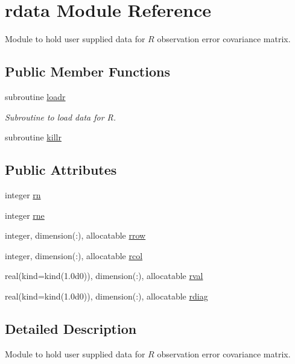 \hypertarget{classrdata}{\section{rdata Module Reference}
\label{classrdata}
}


Module to hold user supplied data for $R$ observation error covariance matrix.  


\subsection*{Public Member Functions}
\begin{DoxyCompactItemize}
\item 
subroutine \hyperlink{classrdata_a10ee06d3ab047a5b82de8d8ee1f6b76e}{loadr}
\begin{DoxyCompactList}\small\item\em Subroutine to load data for R. \end{DoxyCompactList}\item 
subroutine \hyperlink{classrdata_a9236685f842c013fb282e4eb3f5430aa}{killr}
\end{DoxyCompactItemize}
\subsection*{Public Attributes}
\begin{DoxyCompactItemize}
\item 
integer \hyperlink{classrdata_a9a5360e6be18637e65fcae5c55d8db98}{rn}
\item 
integer \hyperlink{classrdata_ae2a9f3970d94f6130c3dfd4f3f955768}{rne}
\item 
integer, dimension(\-:), allocatable \hyperlink{classrdata_aa0e9818ee0a39f028d35cd48a32e5cba}{rrow}
\item 
integer, dimension(\-:), allocatable \hyperlink{classrdata_a293ef50d8603271fa571f705f4d774d4}{rcol}
\item 
real(kind=kind(1.\-0d0)), dimension(\-:), allocatable \hyperlink{classrdata_ae49a7ea0826ee25bffa2ed191b07cbb3}{rval}
\item 
real(kind=kind(1.\-0d0)), dimension(\-:), allocatable \hyperlink{classrdata_a89b639fead94b96b7f5d6aef6a7a449a}{rdiag}
\end{DoxyCompactItemize}


\subsection{Detailed Description}
Module to hold user supplied data for $R$ observation error covariance matrix. 

